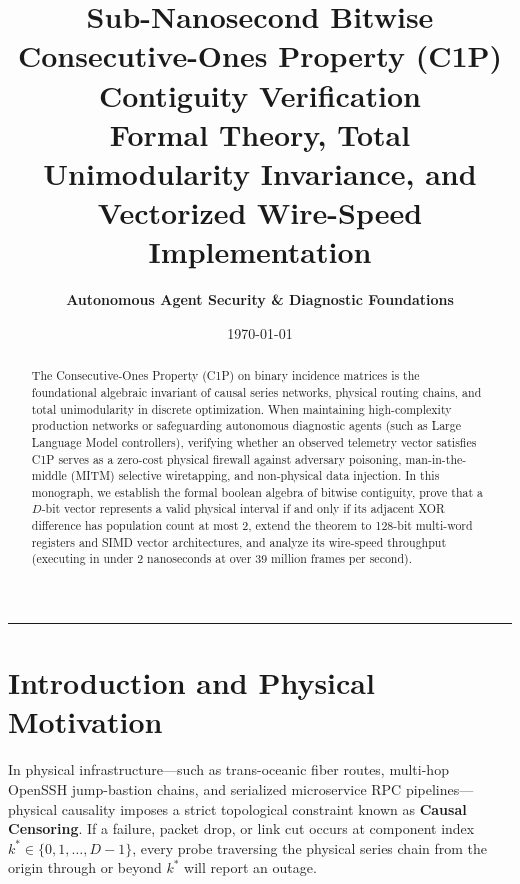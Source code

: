 \documentclass[11pt,a4paper]{article}
\title{\textbf{Sub-Nanosecond Bitwise Consecutive-Ones Property (C1P) Contiguity Verification}\\
\large Formal Theory, Total Unimodularity Invariance, and Vectorized Wire-Speed Implementation}
\author{\textbf{Autonomous Agent Security \& Diagnostic Foundations}}
\date{\today}
\theoremstyle{definition}
\begin{document}
\maketitle

\begin{abstract}
The Consecutive-Ones Property (C1P) on binary incidence matrices is the foundational algebraic invariant of causal series networks, physical routing chains, and total unimodularity in discrete optimization. When maintaining high-complexity production networks or safeguarding autonomous diagnostic agents (such as Large Language Model controllers), verifying whether an observed telemetry vector satisfies C1P serves as a zero-cost physical firewall against adversary poisoning, man-in-the-middle (MITM) selective wiretapping, and non-physical data injection. In this monograph, we establish the formal boolean algebra of bitwise contiguity, prove that a $D$-bit vector represents a valid physical interval if and only if its adjacent XOR difference has population count at most 2, extend the theorem to 128-bit multi-word registers and SIMD vector architectures, and analyze its wire-speed throughput (executing in under 2 nanoseconds at over 39 million frames per second).
\end{abstract}

\tableofcontents
\vspace{1.5em}
\hrule
\vspace{1.5em}

\section{Introduction and Physical Motivation}

In physical infrastructure---such as trans-oceanic fiber routes, multi-hop OpenSSH jump-bastion chains, and serialized microservice RPC pipelines---physical causality imposes a strict topological constraint known as \textbf{Causal Censoring}. If a failure, packet drop, or link cut occurs at component index $k^* \in \{0, 1, \dots, D-1\}$, every probe traversing the physical series chain from the origin through or beyond $k^*$ will report an outage.
\end{document}
